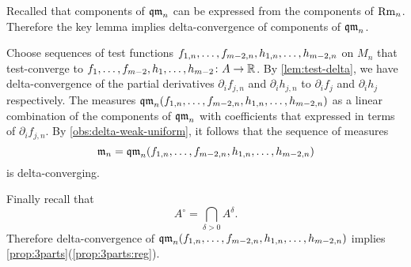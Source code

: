 Recalled that components of $\operatorname{\mathfrak{qm}}_n$ can be expressed from the components of $\operatorname{\rm Rm}_n$.
Therefore the key lemma implies delta-convergence of components of $\operatorname{\mathfrak{qm}}_n$.

Choose sequences of test functions $f_{1,n},\dots,f_{m-2,n},h_{1,n},\zz\dots,h_{m-2,n}$ on $M_n$ that test-converge to $f_{1},\dots,f_{m-2},h_{1},\dots,h_{m-2}\colon A\to \mathbb{R}$.
By \ref{lem:test-delta}, we have delta-convergence of the partial derivatives $\partial_if_{j,n}$ and 
$\partial_ih_{j,n}$ to $\partial_if_{j}$ and 
$\partial_ih_{j}$ respectively.
The measures $\qm_n(f_{1,n},\dots,f_{m-2,n},h_{1,n},\zz\dots,h_{m-2,n})$ 
as a linear combination of the components of $\operatorname{\mathfrak{qm}}_n$ with coefficients that expressed in terms of $\partial_if_{j,n}$.
By \ref{obs:delta-weak-uniform}, it follows that the sequence of measures 
\[\mathfrak m_n=\qm_n(f_{1,n},\dots,f_{m-2,n},h_{1,n},\zz\dots,h_{m-2,n})\]
is delta-converging.

Finally recall that 
\[A^\circ=\bigcap_{\delta>0}A^\delta.\]
Therefore delta-convergence of $\qm_n(f_{1,n},\dots,f_{m-2,n},h_{1,n},\zz\dots,h_{m-2,n})$ implies \ref{prop:3parts}(\ref{prop:3parts:reg}).
\qeds
